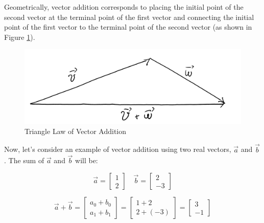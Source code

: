 Geometrically, vector addition corresponds to placing the initial point of the second vector at the terminal point of the first vector and connecting the initial point of the first vector to the terminal point of the second vector (as shown in Figure \ref{fig:vector-sum-1}).
\\
\begin{figure}[h]
    \centering
    \includegraphics[scale=0.2]{Images/Linear_Algebra-vector-sum1.png}
    \caption{Triangle Law of Vector Addition}
    \label{fig:vector-sum-1}
\end{figure}

Now, let's consider an example of vector addition using two real vectors, $\vec a$ and $\vec b$. The sum of $\vec a$ and $\vec b$ will be:

$$
\vec a = \begin{bmatrix}
    1 \\
    2
\end{bmatrix}
\quad
\vec b = \begin{bmatrix}
    2 \\
    -3
\end{bmatrix}
$$

$$
\vec a + \vec b = \begin{bmatrix}
    a_0 + b_0 \\
    a_1 + b_1
\end{bmatrix} = \begin{bmatrix}
    1 + 2 \\
    2 + (-3)
\end{bmatrix} = \begin{bmatrix}
    3 \\
    -1
\end{bmatrix}
$$

